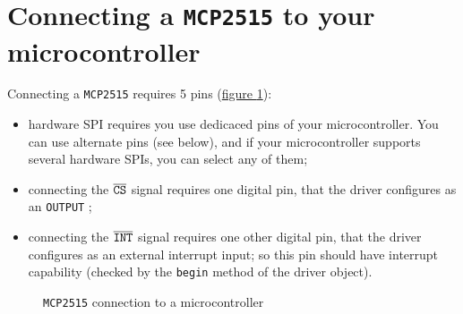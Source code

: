 \documentclass[10pt, a4paper, obeyspaces]{extarticle}
\newcommand\labelFigure[1]{\label{fig:#1}}
\newcommand\refFigure[2]{\hyperref[fig:#2]{figure \ref*{fig:#2}{\ifthenelse{\equal{#1}{}}{}{.#1}}}}
\begin{document}
\section{Connecting a \texttt{MCP2515} to your microcontroller}


Connecting a \texttt{MCP2515} requires 5 pins (\refFigure{}{figureHardwareSPI}):
\begin{itemize}
  \item hardware SPI requires you use dedicaced pins of your microcontroller. You can use alternate pins (see below), and if your microcontroller supports several hardware SPIs, you can select any of them;
  \item connecting the $\overline{\tt CS}$ signal requires one digital pin, that the driver configures as an \texttt{OUTPUT} ;
  \item connecting the $\overline{\tt INT}$ signal requires one other digital pin, that the driver configures as an external interrupt input; so this pin should have interrupt capability (checked by the \texttt{begin} method of the driver object).
\end{itemize}

\begin{figure}[!ht]
  \small
  \centering
  \caption{\texttt{MCP2515} connection to a microcontroller}
  \labelFigure{figureHardwareSPI}
\end{figure}
\end{document}
